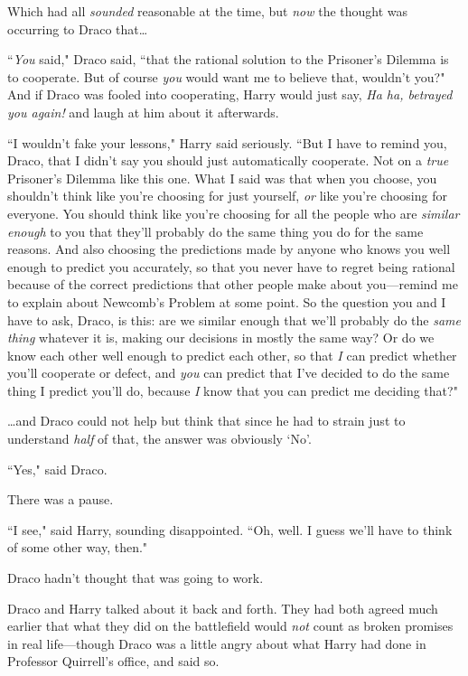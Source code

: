 Which had all \emph{sounded} reasonable at the time, but \emph{now} the thought was occurring to Draco that{\ldots}

``\emph{You} said," Draco said, ``that the rational solution to the Prisoner's Dilemma is to cooperate. But of course \emph{you} would want me to believe that, wouldn't you?" And if Draco was fooled into cooperating, Harry would just say, \emph{Ha ha, betrayed you again!} and laugh at him about it afterwards.

``I wouldn't fake your lessons," Harry said seriously. ``But I have to remind you, Draco, that I didn't say you should just automatically cooperate. Not on a \emph{true} Prisoner's Dilemma like this one. What I said was that when you choose, you shouldn't think like you're choosing for just yourself, \emph{or} like you're choosing for everyone. You should think like you're choosing for all the people who are \emph{similar enough} to you that they'll probably do the same thing you do for the same reasons. And also choosing the predictions made by anyone who knows you well enough to predict you accurately, so that you never have to regret being rational because of the correct predictions that other people make about you—remind me to explain about Newcomb's Problem at some point. So the question you and I have to ask, Draco, is this: are we similar enough that we'll probably do the \emph{same thing} whatever it is, making our decisions in mostly the same way? Or do we know each other well enough to predict each other, so that \emph{I} can predict whether you'll cooperate or defect, and \emph{you} can predict that I've decided to do the same thing I predict you'll do, because \emph{I} know that you can predict me deciding that?"

{\ldots}and Draco could not help but think that since he had to strain just to understand \emph{half} of that, the answer was obviously `No'.

``Yes," said Draco.

There was a pause.

``I see," said Harry, sounding disappointed. ``Oh, well. I guess we'll have to think of some other way, then."

Draco hadn't thought that was going to work.

Draco and Harry talked about it back and forth. They had both agreed much earlier that what they did on the battlefield would \emph{not} count as broken promises in real life—though Draco was a little angry about what Harry had done in Professor Quirrell's office, and said so.

